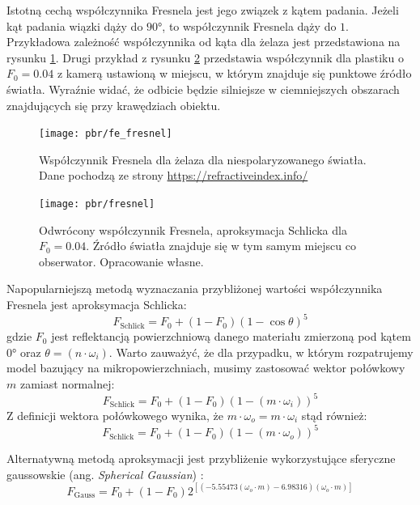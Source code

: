 \documentclass[../main.tex]{subfiles}
\begin{document}
Istotną cechą współczynnika Fresnela jest jego związek z kątem padania. Jeżeli kąt padania wiązki dąży do $\ang{90}$, to współczynnik Fresnela dąży do $1$. Przykładowa zależność współczynnika od kąta dla żelaza jest przedstawiona na rysunku \ref{fig:fe_fresnel}. Drugi przykład z rysunku \ref{fig:schlick_fresnel} przedstawia współczynnik dla plastiku o $F_0 = 0.04$ z kamerą ustawioną w miejscu, w którym znajduje się punktowe źródło światła. Wyraźnie widać, że odbicie będzie silniejsze w ciemniejszych obszarach znajdujących się przy krawędziach obiektu.

\begin{figure}[ht]
    \centering
    \texttt{[image: pbr/fe\_fresnel]}
    \caption{Współczynnik Fresnela dla żelaza dla niespolaryzowanego światła. Dane pochodzą ze strony \url{https://refractiveindex.info/}}
    \label{fig:fe_fresnel}
\end{figure}

\begin{figure}[h]
    \centering
    \texttt{[image: pbr/fresnel]}
    \caption{Odwrócony współczynnik Fresnela, aproksymacja Schlicka dla $F_0 = 0.04$. Źródło światła znajduje się w tym samym miejscu co obserwator. Opracowanie własne.}
    \label{fig:schlick_fresnel}
\end{figure}

Napopularniejszą metodą wyznaczania przybliżonej wartości współczynnika Fresnela jest aproksymacja Schlicka:
\begin{equation}
    F_{\text{Schlick}} = F_0 + (1-F_0)(1-\cos\theta)^5
\end{equation}
\noindent gdzie $F_0$ jest reflektancją powierzchniową danego materiału zmierzoną pod kątem $\ang{0}$ oraz $\theta = (n \cdot \omega_i)$. Warto zauważyć, że dla przypadku, w którym rozpatrujemy model bazujący na mikropowierzchniach, musimy zastosować wektor połówkowy $m$ zamiast normalnej:
\begin{equation}
    F_{\text{Schlick}} = F_0 + (1-F_0)\left(
        1 - \left(
            m \cdot \omega_i
        \right)
    \right)^5
\label{eq:pbr_schlick_half}
\end{equation}
\noindent Z definicji wektora połówkowego wynika, że $m \cdot \omega_o = m \cdot \omega_i$ stąd również:
\begin{equation}
F_{\text{Schlick}} = F_0 + (1-F_0)(1 - (m \cdot \omega_o))^5
\end{equation}

Alternatywną metodą aproksymacji jest przybliżenie wykorzystujące sferyczne gaussowskie (ang. \textit{Spherical Gaussian}) \cite{pbr_ue4,SphericalGaussianLegarde}:
\begin{equation}
    F_{\text{Gauss}} = F_0 +(1−F_0) 2^{\left[
        \left(
            −5.55473\left(\omega_o \cdot m\right)−6.98316
        \right) 
        (\omega_o \cdot m)
  \right]}
\end{equation}
\end{document}
